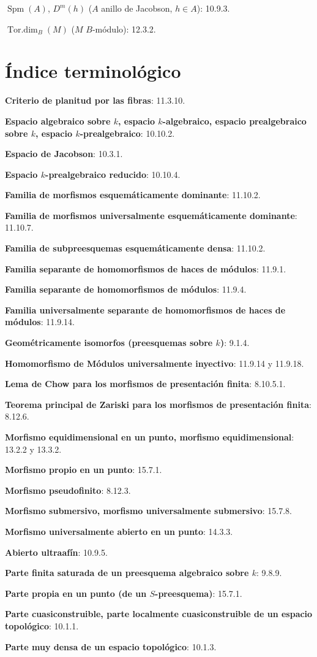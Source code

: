 $\operatorname{Spm}(A)$, $D^m(h)$ ($A$ anillo de Jacobson, $h\in A$): 10.9.3.

$\operatorname{Tor.dim}_B(M)$ ($M$ $B$-módulo): 12.3.2.
\endgroup

\clearpage
{}
{}
\section*{Índice terminológico}

\begingroup
\small
\setlength{\parindent}{0pt}
\setlength{\parskip}{2pt}
\newcommand{\EGAIVthreeTerm}[2]{\textbf{#1}: #2.\par}

\EGAIVthreeTerm{Criterio de planitud por las fibras}{11.3.10}
\EGAIVthreeTerm{Espacio algebraico sobre $k$, espacio $k$-algebraico,
espacio prealgebraico sobre $k$, espacio $k$-prealgebraico}{10.10.2}
\EGAIVthreeTerm{Espacio de Jacobson}{10.3.1}
\EGAIVthreeTerm{Espacio $k$-prealgebraico reducido}{10.10.4}
\EGAIVthreeTerm{Familia de morfismos esquemáticamente dominante}{11.10.2}
\EGAIVthreeTerm{Familia de morfismos universalmente esquemáticamente dominante}{11.10.7}
\EGAIVthreeTerm{Familia de subpreesquemas esquemáticamente densa}{11.10.2}
\EGAIVthreeTerm{Familia separante de homomorfismos de haces de módulos}{11.9.1}
\EGAIVthreeTerm{Familia separante de homomorfismos de módulos}{11.9.4}
\EGAIVthreeTerm{Familia universalmente separante de homomorfismos de haces de módulos}{11.9.14}
\EGAIVthreeTerm{Geométricamente isomorfos (preesquemas sobre $k$)}{9.1.4}
\EGAIVthreeTerm{Homomorfismo de Módulos universalmente inyectivo}{11.9.14 y 11.9.18}
\EGAIVthreeTerm{Lema de Chow para los morfismos de presentación finita}{8.10.5.1}
\EGAIVthreeTerm{Teorema principal de Zariski para los morfismos de presentación finita}{8.12.6}
\EGAIVthreeTerm{Morfismo equidimensional en un punto, morfismo equidimensional}{13.2.2 y 13.3.2}
\EGAIVthreeTerm{Morfismo propio en un punto}{15.7.1}
\EGAIVthreeTerm{Morfismo pseudofinito}{8.12.3}
\EGAIVthreeTerm{Morfismo submersivo, morfismo universalmente submersivo}{15.7.8}
\EGAIVthreeTerm{Morfismo universalmente abierto en un punto}{14.3.3}
\EGAIVthreeTerm{Abierto ultraafín}{10.9.5}
\EGAIVthreeTerm{Parte finita saturada de un preesquema algebraico sobre $k$}{9.8.9}
\EGAIVthreeTerm{Parte propia en un punto (de un $S$-preesquema)}{15.7.1}
\EGAIVthreeTerm{Parte cuasiconstruible, parte localmente cuasiconstruible de un espacio topológico}{10.1.1}
\EGAIVthreeTerm{Parte muy densa de un espacio topológico}{10.1.3}
